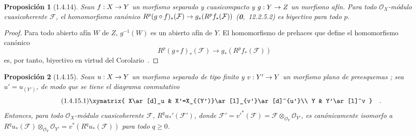 \documentclass[10pt,oneside,openany]{book}
\theoremstyle{egaenv}\newtheorem*{env}{---}
\theoremstyle{egastatement}
\newtheorem*{proposition}{Proposición}
\theoremstyle{egadescription}
\renewcommand{\geq}{\geqslant}
\renewcommand{\to}{\mathchoice{\longrightarrow}{\rightarrow}{\rightarrow}{\rightarrow}}
\begin{document}
\begin{proposition}[1.4.14]
\label{III.1.4.14}
\label{III.1.4.14-fr}
Sean $f:X\to Y$ un morfismo separado y cuasicompacto y $g:Y\to Z$ un morfismo afín.
Para todo $\mathcal O_X$-módulo cuasicoherente $\mathcal F$, el homomorfismo canónico $R^p(g\circ f)_*(\mathcal F)\to g_*(R^pf_*(\mathcal F))$ \textup{(\textbf{0},~12.2.5.2)} es biyectivo para todo $p$.
\end{proposition}

\begin{proof}
Para todo abierto afín $W$ de $Z$, $g^{-1}(W)$ es un abierto afín de $Y$.
El homomorfismo de prehaces que define el homomorfismo canónico
\[
R^p(g\circ f)_*(\mathcal F)\longrightarrow g_*(R^pf_*(\mathcal F))
\]
 es, por tanto, biyectivo en virtud del Corolario~.
\end{proof}

\begin{proposition}[1.4.15]
\label{III.1.4.15}
\label{III.1.4.15-fr}
Sean $u:X\to Y$ un morfismo separado de tipo finito y $v:Y'\to Y$ un morfismo plano de preesquemas ; sea $u'=u_{(Y')}$, de modo que se tiene el diagrama conmutativo
\begin{equation}
\label{III.1.4.15.1-fr}
\tag{1.4.15.1}
\xymatrix{
X\ar[d]_u & X'=X_{(Y')}\ar[l]_{v'}\ar[d]^{u'}\\
Y & Y'\ar[l]^v
}\quad.
\end{equation}
Entonces, para todo $\mathcal O_X$-módulo cuasicoherente $\mathcal F$, $R^qu_*'(\mathcal F')$, donde
$\mathcal F'=v'^*(\mathcal F)=\mathcal F\otimes_{\mathcal O_Y}\mathcal O_{Y'}$,
es canónicamente isomorfo a
$R^qu_*(\mathcal F)\otimes_{\mathcal O_Y}\mathcal O_{Y'}
=v^*(R^qu_*(\mathcal F))$ para todo $q\geq0$.
\end{proposition}
\end{document}
